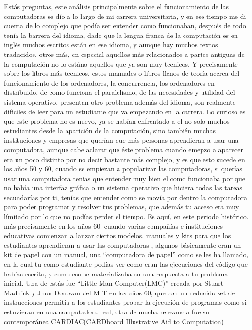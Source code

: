 \documentclass[letterpaper,12pt,oneside]{book}
\begin{document}
	 
	Estás preguntas, este análisis principalmente sobre el funcionamiento de las computadoras se dío a lo largo de mi carrera universitaria, y en ese tiempo me di cuenta de lo complejo que podía ser entender
	como funcionaban, después de todo tenía la barrera del idioma, dado
	que la lengua franca de la computación es en inglés muchos escritos están en ese idioma, y aunque hay muchos textos traducidos, otros más, en especial aquellos más 
	relacionados a partes antiguas de la computación no lo estáno aquellos que ya son muy tecnicos. Y precisamente sobre los libros más tecnicos, estos 
	manuales
	o libros llenos de teoría acerca del funcionamiento de los ordenadores, la concurrencia, los ordenadores en distribuido, de como funciona el paralelismo, de las necesidades y utilidad del sistema operativo, presentan otro problema además
	del idioma, 
	son realmente difíciles de leer para un estudiante que va empezando en la carrera. Lo curioso es que este problema no es nuevo, ya se habían enfrentado a el no solo muchos
	estudiantes desde la aparición de la computación, sino también muchas instituciones y empresas que querían que más personas aprendieran a usar una computadora,
	aunque cabe aclarar que éste problema cuando emepzo a aparecer era un poco distinto por no decir bastante más complejo, y es que esto sucede en los años 50 y 60, cuando se empiezan a popularizar las computadoras, si querías usar una computadora tenías que entender muy bien el como funcionaba por que 
	no había una interfaz gráfica o un sistema operativo que hiciera todas las tareas secundarías por ti, tenías que entender como se movía por dentro la computadora para
	poder programar y resolver tus problemas, que además tu acceso era muy límitado por lo que no podías perder el tiempo. Es aquí, en este periodo histórico, más precisamente en los años 60, cuando varias compañías e instituciones
	educativas comienzan a lanzar ciertos modelos, manuales y kits para que los estudiantes aprendieran a usar las computadoras
	, algunos básicamente eran un kit de papel con un manual, una ``computadora de papel'' como se les ha llamado, en la cual tu como estudiante
	podías ver como eran las ejecuciones del código que habías escrito, y como eso se materializaba en una respuesta a tu problema inicial. Una de estás fue 
	``Little Man Computer(LMC)'' creada por Stuart Madnick y Jhon Donovan del MIT en los años 60, que con un reducido set de instrucciones permitía a los estudiantes probar la
	ejecución de programas como si estuvieran en una computadora real, otra de mucha relevancia fue su contemporánea CARDIAC(CARDboard Illustrative Aid to Computation) 
\end{document}
